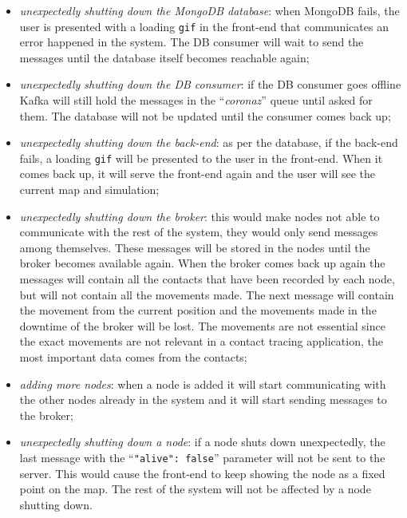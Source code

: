 \documentclass[conference]{IEEEtran}
\begin{document}
	\begin{itemize}
		
		\item \textit{unexpectedly shutting down the MongoDB database}: when MongoDB fails, the user is presented with a loading \texttt{gif} in the front-end that communicates an error happened in the system.
		The DB consumer will wait to send the messages until the database itself becomes reachable again;
		
		\item \textit{unexpectedly shutting down the DB consumer}: if the DB consumer goes offline Kafka will still hold the messages in the ``\textit{coronaz}'' queue until asked for them.
		The database will not be updated until the consumer comes back up;
		
		\item \textit{unexpectedly shutting down the back-end}: as per the database, if the back-end fails, a loading \texttt{gif} will be presented to the user in the front-end.
		When it comes back up, it will serve the front-end again and the user will see the current map and simulation;
		
		\item \textit{unexpectedly shutting down the broker}: this would make nodes not able to communicate with the rest of the system, they would only send messages among themselves. 
		These messages will be stored in the nodes until the broker becomes available again.
		When the broker comes back up again the messages will contain all the contacts that have been recorded by each node, but will not contain all the movements made.
		The next message will contain the movement from the current position and the movements made in the downtime of the broker will be lost.
		The movements are not essential since the exact movements are not relevant in a contact tracing application, the most important data comes from the contacts;
		
		\item \textit{adding more nodes}: when a node is added it will start communicating with the other nodes already in the system and it will start sending messages to the broker;
		
		\item \textit{unexpectedly shutting down a node}: if a node shuts down unexpectedly, the last message with the ``\texttt{"alive": false}'' parameter will not be sent to the server.
		This would cause the front-end to keep showing the node as a fixed point on the map.
		The rest of the system will not be affected by a node shutting down.
		
	\end{itemize}
\end{document}
